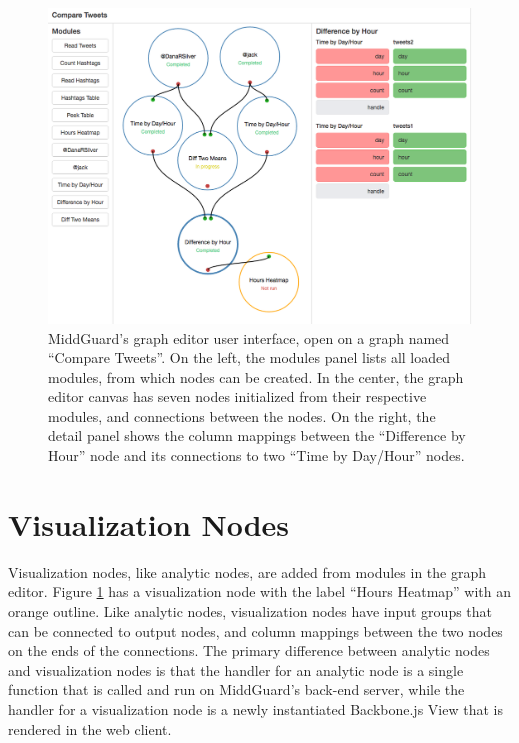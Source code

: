\documentclass[midd]{thesis}
\begin{document}
\begin{figure}[!ht]
  \centering
  \includegraphics[width=1\textwidth]{compare-tweets-graph-editor-no-sidebar}
  \caption{MiddGuard's graph editor user interface, open on a graph named
  ``Compare Tweets''. On the left, the modules panel lists all loaded modules,
  from which nodes can be created. In the center, the graph editor canvas has
  seven nodes initialized from their respective modules, and connections between
  the nodes. On the right, the detail panel shows the column mappings between
  the ``Difference by Hour'' node and its connections to two
  ``Time by Day/Hour'' nodes.}
  \label{fig:grapheditor}
\end{figure}

\section{Visualization Nodes}

Visualization nodes, like analytic nodes, are added from modules in the graph
editor. Figure \ref{fig:grapheditor} has a visualization node with the label
``Hours Heatmap'' with an orange outline. Like analytic nodes, visualization
nodes have input groups that can be connected to output nodes, and column
mappings between the two nodes on the ends of the connections. The primary
difference between analytic nodes and visualization nodes is that the handler
for an analytic node is a single function that is called and run on MiddGuard's
back-end server, while the handler for a visualization node is a newly
instantiated Backbone.js View \cite{backbone} that is rendered in the web
client.
\end{document}
